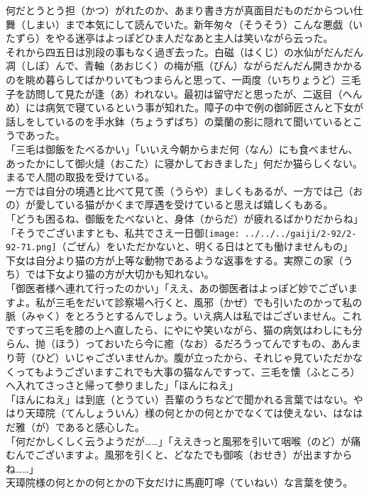 \documentclass{book}
\begin{document}
何だとうとう担（かつ）がれたのか、あまり書き方が真面目だものだからつい仕舞（しまい）まで本気にして読んでいた。新年匆々（そうそう）こんな悪戯（いたずら）をやる迷亭はよっぽどひま人だなあと主人は笑いながら云った。\\
それから四五日は別段の事もなく過ぎ去った。白磁（はくじ）の水仙がだんだん凋（しぼ）んで、青軸（あおじく）の梅が瓶（びん）ながらだんだん開きかかるのを眺め暮らしてばかりいてもつまらんと思って、一両度（いちりょうど）三毛子を訪問して見たが逢（あ）われない。最初は留守だと思ったが、二返目（へんめ）には病気で寝ているという事が知れた。障子の中で例の御師匠さんと下女が話しをしているのを手水鉢（ちょうずばち）の葉蘭の影に隠れて聞いているとこうであった。\\
「三毛は御飯をたべるかい」「いいえ今朝からまだ何（なん）にも食べません、あったかにして御火燵（おこた）に寝かしておきました」何だか猫らしくない。まるで人間の取扱を受けている。\\
一方では自分の境遇と比べて見て羨（うらや）ましくもあるが、一方では己（おの）が愛している猫がかくまで厚遇を受けていると思えば嬉しくもある。\\
「どうも困るね、御飯をたべないと、身体（からだ）が疲れるばかりだからね」「そうでございますとも、私共でさえ一日御\texttt{[image: ../../../gaiji/2-92/2-92-71.png]}（ごぜん）をいただかないと、明くる日はとても働けませんもの」\\
下女は自分より猫の方が上等な動物であるような返事をする。実際この家（うち）では下女より猫の方が大切かも知れない。\\
「御医者様へ連れて行ったのかい」「ええ、あの御医者はよっぽど妙でございますよ。私が三毛をだいて診察場へ行くと、風邪（かぜ）でも引いたのかって私の脈（みゃく）をとろうとするんでしょう。いえ病人は私ではございません。これですって三毛を膝の上へ直したら、にやにや笑いながら、猫の病気はわしにも分らん、抛（ほう）っておいたら今に癒（なお）るだろうってんですもの、あんまり苛（ひど）いじゃございませんか。腹が立ったから、それじゃ見ていただかなくってもようございますこれでも大事の猫なんですって、三毛を懐（ふところ）へ入れてさっさと帰って参りました」「ほんにねえ」\\
「ほんにねえ」は到底（とうてい）吾輩のうちなどで聞かれる言葉ではない。やはり天璋院（てんしょういん）様の何とかの何とかでなくては使えない、はなはだ雅（が）であると感心した。\\
「何だかしくしく云うようだが\ldots{}\ldots{}」「ええきっと風邪を引いて咽喉（のど）が痛むんでございますよ。風邪を引くと、どなたでも御咳（おせき）が出ますからね\ldots{}\ldots{}」\\
天璋院様の何とかの何とかの下女だけに馬鹿叮嚀（ていねい）な言葉を使う。\\
\end{document}

